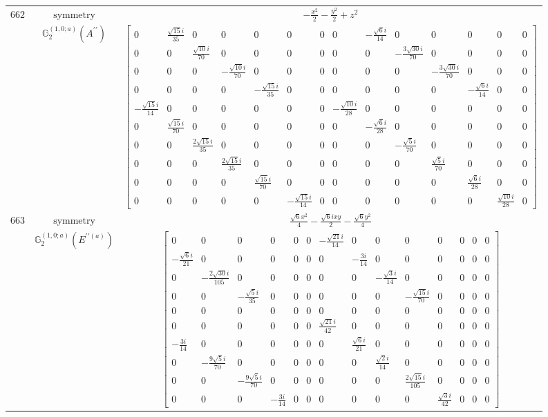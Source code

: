 \documentclass[fleqn,8pt,landscape]{jsarticle}
\begin{document}
\begin{longtable}{ccc}
$ 662 $ & $ \text{symmetry} $ & $ - \frac{x^{2}}{2} - \frac{y^{2}}{2} + z^{2} $ \\
$  $ & $ \mathbb{G}_{2}^{(1,0;a)}(A^{\prime\prime}) $ & $ \begin{bmatrix} 0 & \frac{\sqrt{15} i}{35} & 0 & 0 & 0 & 0 & 0 & 0 & - \frac{\sqrt{6} i}{14} & 0 & 0 & 0 & 0 & 0 \\ 0 & 0 & \frac{\sqrt{10} i}{70} & 0 & 0 & 0 & 0 & 0 & 0 & - \frac{3 \sqrt{30} i}{70} & 0 & 0 & 0 & 0 \\ 0 & 0 & 0 & - \frac{\sqrt{10} i}{70} & 0 & 0 & 0 & 0 & 0 & 0 & - \frac{3 \sqrt{30} i}{70} & 0 & 0 & 0 \\ 0 & 0 & 0 & 0 & - \frac{\sqrt{15} i}{35} & 0 & 0 & 0 & 0 & 0 & 0 & - \frac{\sqrt{6} i}{14} & 0 & 0 \\ - \frac{\sqrt{15} i}{14} & 0 & 0 & 0 & 0 & 0 & 0 & - \frac{\sqrt{10} i}{28} & 0 & 0 & 0 & 0 & 0 & 0 \\ 0 & \frac{\sqrt{15} i}{70} & 0 & 0 & 0 & 0 & 0 & 0 & - \frac{\sqrt{6} i}{28} & 0 & 0 & 0 & 0 & 0 \\ 0 & 0 & \frac{2 \sqrt{15} i}{35} & 0 & 0 & 0 & 0 & 0 & 0 & - \frac{\sqrt{5} i}{70} & 0 & 0 & 0 & 0 \\ 0 & 0 & 0 & \frac{2 \sqrt{15} i}{35} & 0 & 0 & 0 & 0 & 0 & 0 & \frac{\sqrt{5} i}{70} & 0 & 0 & 0 \\ 0 & 0 & 0 & 0 & \frac{\sqrt{15} i}{70} & 0 & 0 & 0 & 0 & 0 & 0 & \frac{\sqrt{6} i}{28} & 0 & 0 \\ 0 & 0 & 0 & 0 & 0 & - \frac{\sqrt{15} i}{14} & 0 & 0 & 0 & 0 & 0 & 0 & \frac{\sqrt{10} i}{28} & 0 \end{bmatrix} $ \\ \hline
$ 663 $ & $ \text{symmetry} $ & $ \frac{\sqrt{6} x^{2}}{4} - \frac{\sqrt{6} i x y}{2} - \frac{\sqrt{6} y^{2}}{4} $ \\
$  $ & $ \mathbb{G}_{2}^{(1,0;a)}(E^{\prime\prime(a)}) $ & $ \begin{bmatrix} 0 & 0 & 0 & 0 & 0 & 0 & - \frac{\sqrt{21} i}{14} & 0 & 0 & 0 & 0 & 0 & 0 & 0 \\ - \frac{\sqrt{6} i}{21} & 0 & 0 & 0 & 0 & 0 & 0 & - \frac{3 i}{14} & 0 & 0 & 0 & 0 & 0 & 0 \\ 0 & - \frac{2 \sqrt{30} i}{105} & 0 & 0 & 0 & 0 & 0 & 0 & - \frac{\sqrt{3} i}{14} & 0 & 0 & 0 & 0 & 0 \\ 0 & 0 & - \frac{\sqrt{5} i}{35} & 0 & 0 & 0 & 0 & 0 & 0 & - \frac{\sqrt{15} i}{70} & 0 & 0 & 0 & 0 \\ 0 & 0 & 0 & 0 & 0 & 0 & 0 & 0 & 0 & 0 & 0 & 0 & 0 & 0 \\ 0 & 0 & 0 & 0 & 0 & 0 & \frac{\sqrt{21} i}{42} & 0 & 0 & 0 & 0 & 0 & 0 & 0 \\ - \frac{3 i}{14} & 0 & 0 & 0 & 0 & 0 & 0 & \frac{\sqrt{6} i}{21} & 0 & 0 & 0 & 0 & 0 & 0 \\ 0 & - \frac{9 \sqrt{5} i}{70} & 0 & 0 & 0 & 0 & 0 & 0 & \frac{\sqrt{2} i}{14} & 0 & 0 & 0 & 0 & 0 \\ 0 & 0 & - \frac{9 \sqrt{5} i}{70} & 0 & 0 & 0 & 0 & 0 & 0 & \frac{2 \sqrt{15} i}{105} & 0 & 0 & 0 & 0 \\ 0 & 0 & 0 & - \frac{3 i}{14} & 0 & 0 & 0 & 0 & 0 & 0 & \frac{\sqrt{3} i}{42} & 0 & 0 & 0 \end{bmatrix} $ \\ \hline

\end{longtable}
\end{document}
